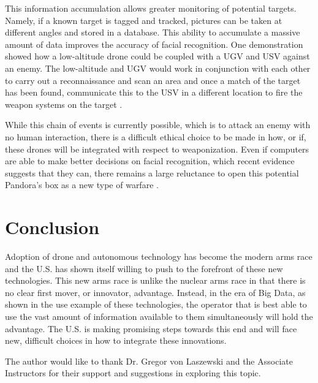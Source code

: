 \documentclass[sigconf]{acmart}
\begin{document}
This information accumulation allows greater monitoring of potential targets. Namely, if a known target is tagged and tracked, pictures can be taken at different angles and stored in a database. This ability to accumulate a massive amount of data improves the accuracy of facial recognition. One demonstration showed how a low-altitude drone could be coupled with a UGV and USV against an enemy. The low-altitude and UGV would work in conjunction with each other to carry out a reconnaissance and scan an area and once a match of the target has been found, communicate this to the USV in a different location to fire the weapon systems on the target \cite{60minutes}. 

While this chain of events is currently possible, which is to attack an enemy with no human interaction, there is a difficult ethical choice to be made in how, or if, these drones will be integrated with respect to weaponization. Even if computers are able to make better decisions on facial recognition, which recent evidence suggests that they can, there remains a large reluctance to open this potential Pandora's box as a new type of warfare \cite{googleface}. 

\section{Conclusion}
Adoption of drone and autonomous technology has become the modern arms race and the U.S. has shown itself willing to push to the forefront of these new technologies. This new arms race is unlike the nuclear arms race in that there is no clear first mover, or innovator, advantage. Instead, in the era of Big Data, as shown in the use example of these technologies, the operator that is best able to use the vast amount of information available to them simultaneously will hold the advantage. The U.S. is making promising steps towards this end and will face new, difficult choices in how to integrate these innovations.


 
 
 
\begin{acks}
The author would like to thank Dr. Gregor von Laszewski and the Associate Instructors for their support and suggestions in exploring this topic.
\end{acks}


 

%
\end{document}
